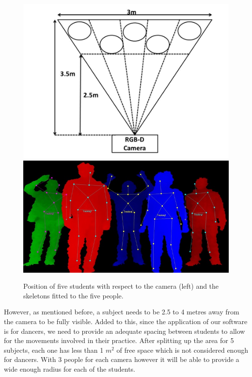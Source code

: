 \documentclass[11pt,a4paper]{article}
\begin{document}
\begin{figure}[H]
\centering
\includegraphics[scale=0.25]{multi_people1.jpg}
\includegraphics[scale=0.6]{multi_people2.jpg}
\caption{Position of five students with respect to the camera (left) and the skeletons fitted to the five people.}
\label{people_pos}
\end{figure}
\noindent
However, as mentioned before, a subject needs to be 2.5 to 4 metres away from the camera to be fully visible. Added to this, since the application of our software is for dancers, we need to provide an adequate spacing between students to allow for the movements involved in their practice. After splitting up the area for 5 subjects, each one has less than 1 $m^2$ of free space which is not considered enough for dancers. With 3 people for each camera however it will be able to provide a wide enough radius for each of the students.
\end{document}
